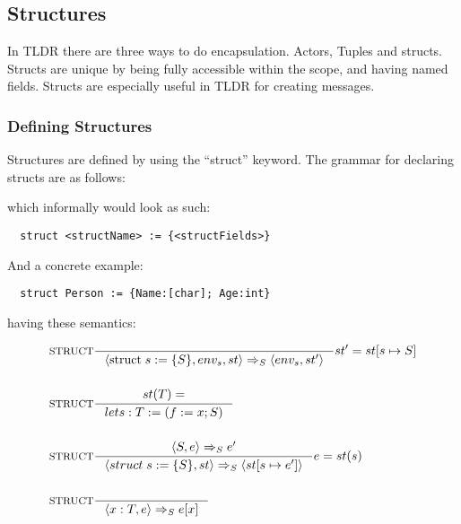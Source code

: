 \subsection{Structures}
\label{subsec:structs}

In TLDR there are three ways to do encapsulation. Actors, Tuples and structs. Structs are unique by being fully accessible within the scope, and having named fields. Structs are especially useful in TLDR for creating messages.

\subsubsection{Defining Structures}
\label{sec:defStructures}

Structures are defined by using the \enquote{struct} keyword. The grammar for declaring structs are as follows:


which informally would look as such:

\begin{verbatim}
  struct <structName> := {<structFields>}
\end{verbatim}

And a concrete example:

\begin{verbatim}
  struct Person := {Name:[char]; Age:int}
\end{verbatim}

having these semantics:

\begin{align*}
&\inference[$\text{STRUCT}$]{}
                            {\Braket{\Tstruct s := \{S\}, env_s, st} \Rightarrow_S \Braket{env_s,st'}}
                            {st' = st[s \mapsto S]}
\\\\
&\inference[$\text{STRUCT}$]{st(T) = }
                            {let s:T := (f := x;S)}
                            {}
\\\\
&\inference[$\text{STRUCT}$]{\Braket{S, e} \Rightarrow_S e'}
                            {\Braket{struct\;s := \{S\}, st} \Rightarrow_S \Braket{st[s \mapsto e']}}
                            {e=st(s)}
\\\\
&\inference[$\text{STRUCT}$]{}
                            {\Braket{x:T, e} \Rightarrow_S e[x]}
\end{align*}

